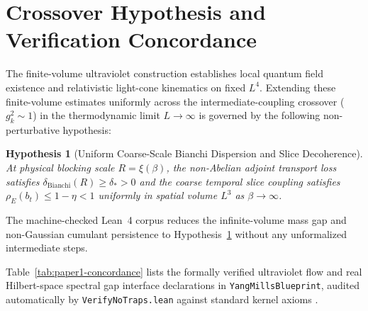 \documentclass[11pt,a4paper]{article}
\newtheorem{hypothesis}{Hypothesis}[section]
\begin{document}
\section{Crossover Hypothesis and Verification Concordance}
\label{sec:p1-concordance}
The finite-volume ultraviolet construction establishes local quantum field existence and relativistic light-cone kinematics on fixed $L^4$. Extending these finite-volume estimates uniformly across the intermediate-coupling crossover ($g_k^2 \sim 1$) in the thermodynamic limit $L \to \infty$ is governed by the following non-perturbative hypothesis:

\begin{hypothesis}[Uniform Coarse-Scale Bianchi Dispersion and Slice Decoherence]
\label{hyp:p1-crossover}
At physical blocking scale $R = \xi(\beta)$, the non-Abelian adjoint transport loss satisfies $\delta_{\mathrm{Bianchi}}(R) \ge \delta_* > 0$ and the coarse temporal slice coupling satisfies $\rho_E(b_t) \le 1 - \eta < 1$ uniformly in spatial volume $L^3$ as $\beta \to \infty$.
\end{hypothesis}

The machine-checked Lean~4 corpus reduces the infinite-volume mass gap and non-Gaussian cumulant persistence to Hypothesis~\ref{hyp:p1-crossover} without any unformalized intermediate steps.

Table~\ref{tab:paper1-concordance} lists the formally verified ultraviolet flow and real Hilbert-space spectral gap interface declarations in \texttt{YangMillsBlueprint}, audited automatically by \texttt{VerifyNoTraps.lean} against standard kernel axioms \cite{Mathlib4}.
\end{document}
